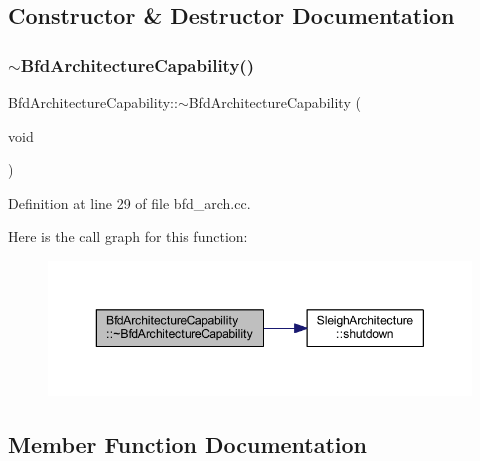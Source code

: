 \subsection{Constructor \& Destructor Documentation}
\mbox{\label{class_bfd_architecture_capability_ac262136bf3d1dce327a77dbf02c40a60}} 
\subsubsection{\texorpdfstring{$\sim$BfdArchitectureCapability()}{~BfdArchitectureCapability()}}
{\footnotesize\ttfamily Bfd\+Architecture\+Capability\+::$\sim$\+Bfd\+Architecture\+Capability (\begin{DoxyParamCaption}\item[{void}]{ }\end{DoxyParamCaption})\hspace{0.3cm}{\ttfamily [virtual]}}



Definition at line 29 of file bfd\+\_\+arch.\+cc.

Here is the call graph for this function\+:
\nopagebreak
\begin{figure}[H]
\begin{center}
\leavevmode
\includegraphics[width=350pt]{class_bfd_architecture_capability_ac262136bf3d1dce327a77dbf02c40a60_cgraph}
\end{center}
\end{figure}


\subsection{Member Function Documentation}
\mbox{\label{class_bfd_architecture_capability_ac03b938e119bf80fcbc83b22db84ccf1}} 
